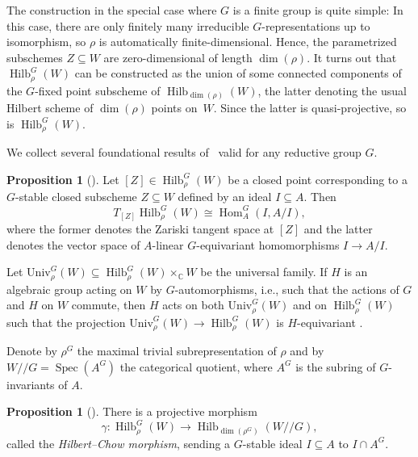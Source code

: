 \documentclass[11pt]{amsart}
\theoremstyle{definition}
\newtheorem{proposition}[theorem]{Proposition}
\newcommand{\CC}{\mathbb{C}}
\DeclareMathOperator{\Spec}{Spec}
\DeclareMathOperator{\Hilb}{Hilb}
\DeclareMathOperator{\Hom}{Hom}
\begin{document}
The construction in the special case where $G$ is a finite group is quite simple: In this case, there are only finitely many irreducible $G$-representations up to isomorphism, so $\rho$ is automatically finite-dimensional. Hence, the parametrized subschemes $Z \subseteq W$ are zero-dimensional of length $\dim(\rho)$. It turns out that $\Hilb_\rho^G(W)$ can be constructed as the union of some connected components of the $G$-fixed point subscheme of $\Hilb_{\dim(\rho)}(W)$, the latter denoting the usual Hilbert scheme of $\dim(\rho)$ points on~$W$. Since the latter is quasi-projective, so is $\Hilb_\rho^G(W)$.

We collect several foundational results of~\cite{BrionInvariantHilb} valid for any reductive group $G$.

\begin{proposition}[{\cite[Proposition~3.5]{BrionInvariantHilb}}]
    Let $[Z] \in \Hilb_\rho^G(W)$ be a closed point corresponding to a $G$-stable closed subscheme $Z \subseteq W$ defined by an ideal $I \subseteq A$. Then
    \begin{equation*}
        T_{[Z]} \Hilb_\rho^G(W) \cong \Hom_A^G(I,A/I),
    \end{equation*}
    where the former denotes the Zariski tangent space at $[Z]$ and the latter denotes the vector space of $A$-linear $G$-equivariant homomorphisms $I \rightarrow A/I$.
\end{proposition}

Let $\mathrm{Univ}_\rho^G(W) \subseteq \Hilb_\rho^G(W) \times_\CC W$ be the universal family. If $H$ is an algebraic group acting on $W$ by $G$-automorphisms, i.e., such that the actions of $G$ and $H$ on $W$ commute, then $H$ acts on both $\mathrm{Univ}_\rho^G(W)$ and on $\Hilb_\rho^G(W)$ such that the projection $\mathrm{Univ}_\rho^G(W) \rightarrow \Hilb_\rho^G(W)$ is $H$-equivariant \cite[Proposition~3.10]{BrionInvariantHilb}.

Denote by $\rho^G$ the maximal trivial subrepresentation of $\rho$ and by $W//G = \Spec(A^G)$ the categorical quotient, where $A^G$ is the subring of $G$-invariants of $A$.

\begin{proposition}[{\cite[Proposition~3.12]{BrionInvariantHilb}}]\label{prop:BrionHilbertChow}
    There is a projective morphism
    \begin{equation*}
        \gamma \colon \Hilb_\rho^G(W) \longrightarrow \Hilb_{\dim(\rho^G)}(W//G),
    \end{equation*}
    called the \emph{Hilbert--Chow morphism}, sending a $G$-stable ideal $I \subseteq A$ to $I \cap A^G$.
\end{proposition}
\end{document}
